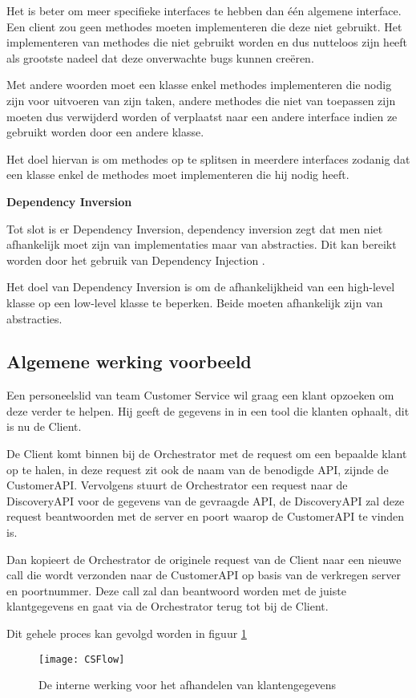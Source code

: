 Het is beter om meer specifieke interfaces te hebben dan één algemene interface. Een client zou geen methodes moeten implementeren die deze niet gebruikt. Het implementeren van methodes die niet gebruikt worden en dus nutteloos zijn heeft als grootste nadeel dat deze onverwachte bugs kunnen creëren.
 
 Met andere woorden moet een klasse enkel methodes implementeren die nodig zijn voor uitvoeren van zijn taken, andere methodes die niet van toepassen zijn moeten dus verwijderd worden of verplaatst naar een andere interface indien ze gebruikt worden door een andere klasse.
 
 Het doel hiervan is om methodes op te splitsen in meerdere interfaces zodanig dat een klasse enkel de methodes moet implementeren die hij nodig heeft.
 
 \textbf{Dependency Inversion}
 
 Tot slot is er Dependency Inversion, dependency inversion zegt dat men niet afhankelijk moet zijn van implementaties maar van abstracties. Dit kan bereikt worden door het gebruik van Dependency Injection \autocite{Ilyana}.
 
 Het doel van Dependency Inversion is om de afhankelijkheid van een high-level klasse op een low-level klasse te beperken. Beide moeten afhankelijk zijn van abstracties.
 
 
 \subsection{Algemene werking voorbeeld}
 \label{subsec:Algemene werking voorbeeld}
 
 Een personeelslid van team Customer Service wil graag een klant opzoeken om deze verder te helpen. Hij geeft de gegevens in in een tool die klanten ophaalt, dit is nu de Client. 
 
 De Client komt binnen bij de Orchestrator met de request om een bepaalde klant op te halen, in deze request zit ook de naam van de benodigde API, zijnde de CustomerAPI. Vervolgens stuurt de Orchestrator een request naar de DiscoveryAPI voor de gegevens van de gevraagde API, de DiscoveryAPI zal deze request beantwoorden met de server en poort waarop de CustomerAPI te vinden is. 
 
 Dan kopieert de Orchestrator de originele request van de Client naar een nieuwe call die wordt verzonden naar de CustomerAPI op basis van de verkregen server en poortnummer. Deze call zal dan beantwoord worden met de juiste klantgegevens en gaat via de Orchestrator terug tot bij de Client. 
 
 Dit gehele proces kan gevolgd worden in figuur \ref{fig:CSFlow}
 
 \begin{figure}[H]
     \centering
     \texttt{[image: CSFlow]}
     \caption[Customer Service Dataflow]{De interne werking voor het afhandelen van klantengegevens}
     \label{fig:CSFlow}
 \end{figure}
 
 
 
 







